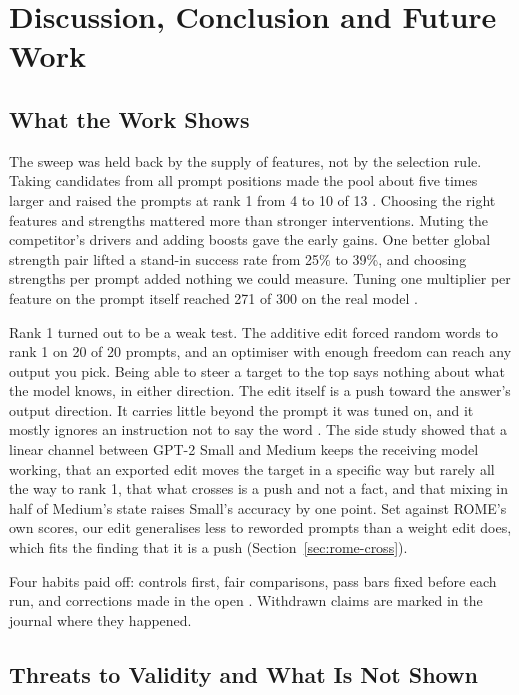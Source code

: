 \chapter{Discussion, Conclusion and Future Work}\label{ch:conclusion}

\section{What the Work Shows}

The sweep was held back by the supply of features, not by the selection rule. Taking candidates from all prompt positions made the pool about five times larger and raised the prompts at rank 1 from 4 to 10 of 13 \cite{p7}. Choosing the right features and strengths mattered more than stronger interventions. Muting the competitor's drivers and adding boosts gave the early gains. One better global strength pair lifted a stand-in success rate from 25\% to 39\%, and choosing strengths per prompt added nothing we could measure. Tuning one multiplier per feature on the prompt itself reached 271 of 300 on the real model \cite{p12,p13}.

Rank 1 turned out to be a weak test. The additive edit forced random words to rank 1 on 20 of 20 prompts, and an optimiser with enough freedom can reach any output you pick. Being able to steer a target to the top says nothing about what the model knows, in either direction. The edit itself is a push toward the answer's output direction. It carries little beyond the prompt it was tuned on, and it mostly ignores an instruction not to say the word \cite{p14}. The side study showed that a linear channel between GPT-2 Small and Medium keeps the receiving model working, that an exported edit moves the target in a specific way but rarely all the way to rank 1, that what crosses is a push and not a fact, and that mixing in half of Medium's state raises Small's accuracy by one point. Set against ROME's own scores, our edit generalises less to reworded prompts than a weight edit does, which fits the finding that it is a push (Section~\ref{sec:rome-cross}).

Four habits paid off: controls first, fair comparisons, pass bars fixed before each run, and corrections made in the open \cite{p14,p18}. Withdrawn claims are marked in the journal where they happened.

\section{Threats to Validity and What Is Not Shown}

